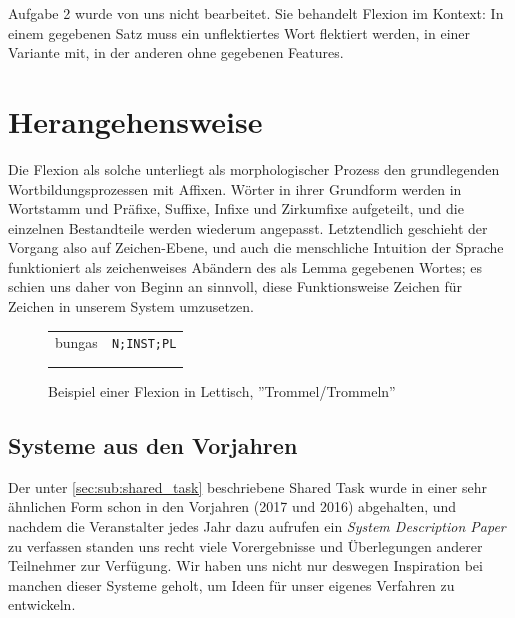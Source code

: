 \documentclass[a4paper]{article}
\begin{document}
Aufgabe 2 wurde von uns nicht bearbeitet. Sie behandelt Flexion im Kontext: In einem gegebenen Satz muss ein unflektiertes Wort flektiert werden, in einer Variante mit, in der anderen ohne gegebenen Features.

\section{Herangehensweise}
\label{sec:approach}

Die Flexion als solche unterliegt als morphologischer Prozess den grundlegenden Wortbildungsprozessen mit Affixen. Wörter in ihrer Grundform werden in Wortstamm und Präfixe, Suffixe, Infixe und Zirkumfixe aufgeteilt, und die einzelnen Bestandteile werden wiederum angepasst. 
Letztendlich geschieht der Vorgang also auf Zeichen-Ebene, und auch die menschliche Intuition der Sprache funktioniert als zeichenweises Abändern des als Lemma gegebenen Wortes; es schien uns daher von Beginn an sinnvoll, diese Funktionsweise Zeichen für Zeichen in unserem System umzusetzen.

\begin{figure}[htb]
\centering
\begin{tabular}{cc}
bungas & \texttt{N;INST;PL}\\  \addlinespace
\multicolumn{2}{c}{$\Downarrow$}\\ \addlinespace
\multicolumn{2}{c}{bungām}
\end{tabular}
\caption{Beispiel einer Flexion in Lettisch, ''Trommel/Trommeln''}
\label{fig:example-inflection}
\end{figure}

\subsection{Systeme aus den Vorjahren}
Der unter \autoref{sec:sub:shared_task} beschriebene Shared Task wurde in einer sehr ähnlichen Form schon in den Vorjahren (2017 und 2016) abgehalten, und nachdem die Veranstalter jedes Jahr dazu aufrufen ein \textit{System Description Paper} zu verfassen standen uns recht viele Vorergebnisse und Überlegungen anderer Teilnehmer zur Verfügung. Wir haben uns nicht nur deswegen Inspiration bei manchen dieser Systeme geholt, um Ideen für unser eigenes Verfahren zu entwickeln.
\end{document}
